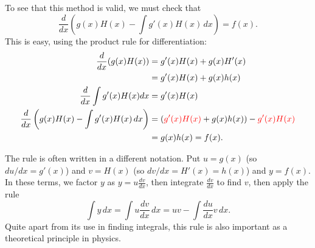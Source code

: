 \documentclass[a4paper]{book}
\theoremstyle{definition}
\begin{document}
To see that this method is valid, we must check that
\[ \frac{d}{dx}\left(g(x)H(x) - \int g'(x)H(x)\, dx\right) = f(x). \]
This is easy, using the product rule for differentiation:
\begin{align*}
 \frac{d}{dx}(g(x)H(x)) &= g'(x)H(x) + g(x)H'(x) \\
  &= g'(x)H(x) + g(x) h(x) \\
 \frac{d}{dx}\int g'(x)H(x) dx &= g'(x) H(x) \\
 \frac{d}{dx}\left(g(x)H(x) - \int g'(x)H(x)\, dx\right) &= 
  ({\color{red}g'(x)H(x)} + g(x)h(x)) - {\color{red}g'(x)H(x)} \\
  &= g(x)h(x) = f(x).
\end{align*}

The rule is often written in a different notation.  Put $u=g(x)$ (so
$du/dx=g'(x)$) and $v=H(x)$ (so $dv/dx=H'(x)=h(x)$) and $y=f(x)$.  In
these terms, we factor $y$ as $y=u\frac{dv}{dx}$, then integrate
$\frac{dv}{dx}$ to find $v$, then apply the rule
\[ \int y\,dx = \int u\frac{dv}{dx}\, dx =
     uv - \int \frac{du}{dx} v\,dx.
\]
Quite apart from its use in finding integrals, this rule is also
important as a theoretical principle in physics.
\end{document}
